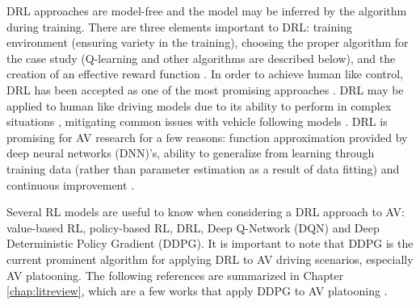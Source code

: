 DRL approaches are model-free and the model may be inferred by the algorithm during
training.  There are three elements important to DRL: training environment (ensuring
variety in the training), choosing the proper algorithm for the case study (Q-learning
and other algorithms are described below), and the creation of an effective reward
function \cite{Ye2019}.  In order to achieve human like control, DRL has been accepted
as one of the most promising approaches \cite{ElSallab2017a}.  DRL may be applied to
human like driving models due to its ability to perform in complex situations
\cite{Zhu2018}, mitigating common issues with vehicle following models \cite{Zhu2018}.
DRL is promising for AV research for a few reasons: function approximation provided
by deep neural networks (DNN)'s, ability to generalize from learning through training
data (rather than parameter estimation as a result of data fitting) and continuous
improvement \cite{Zhu2018}.

Several RL models are useful to know when considering a DRL approach
to AV: value-based RL, policy-based RL, DRL, Deep Q-Network (DQN) and Deep Deterministic
Policy Gradient (DDPG). It is important to note that DDPG is the current prominent algorithm
for applying DRL to AV driving scenarios, especially AV platooning. The following
references are summarized in Chapter \ref{chap:litreview}, which are a few works that apply
DDPG to AV platooning \cite{Lin2019, Song2020, Chu2019b, Peake2020}.

